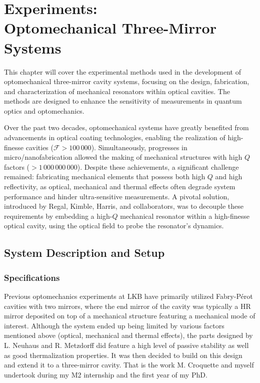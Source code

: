 \chapter{Experiments: \\ Optomechanical Three-Mirror Systems}

This chapter will cover the experimental methods used in the development of optomechanical three-mirror cavity systems, focusing on the design, fabrication, and characterization of mechanical resonators within optical cavities. The methods are designed to enhance the sensitivity of measurements in quantum optics and optomechanics.
\minitoc
\newpage 

Over the past two decades, optomechanical systems have greatly benefited from advancements in optical coating technologies, enabling the realization of high-finesse cavities ($\mathcal{F}>100\,000$)\cite{coating_review}. Simultaneously, progresses in micro/nanofabrication allowed the making of mechanical structures with high $Q$ factors ($>1\,000\,000\,000$)\cite{nanofab_review}. Despite these achievements, a significant challenge remained: fabricating mechanical elements that possess both high $Q$ and high reflectivity, as optical, mechanical and thermal effects often degrade system performance and hinder ultra-sensitive measurements\cite{optomech_challenges}. A pivotal solution, introduced by Regal, Kimble, Harris, and collaborators\cite{Regal2008,Harris2008}, was to decouple these requirements by embedding a high-$Q$ mechanical resonator within a high-finesse optical cavity, using the optical field to probe the resonator’s dynamics.
\section{System Description and Setup}
\subsection{Specifications}
Previous optomechanics experiments at LKB have primarily utilized Fabry-Pérot cavities with two mirrors, where the end mirror of the cavity was typically a HR mirror deposited on top of a mechanical structure featuring a mechanical mode of interest\cite{LKB_FP}. Although the system ended up being limited by various factors mentioned above (optical, mechanical and thermal effects)\cite{optomech_challenges}, the parts designed by L. Neuhaus and R. Metzdorff did feature a high level of passive stability as well as good thermalization properties. It was then decided to build on this design and extend it to a three-mirror cavity. That is the work M. Croquette and myself undertook during my M2 internship and the first year of my PhD. \\

